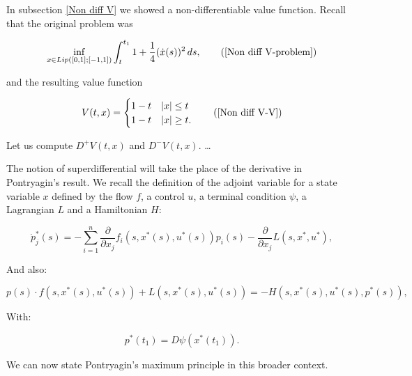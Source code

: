 \begin{example}
    In subsection \ref{Non diff V} we showed a non-differentiable value function. Recall that the original problem was
    
    \begin{equation}
        \inf_{x\in Lip([0,1];[-1,1])} \int_t^{t_1} 1 + \frac{1}{4}(\dot{x}(s))^2 \,ds,
        \tag{\ref{Non diff V-problem}}
    \end{equation}
    
    and the resulting value function
    
    \begin{equation}
        V(t,x)=\begin{cases}
            1-t & \abs{x}\leq t \\
            1-t& \abs{x}\geq t.
        \end{cases}
        \tag{\ref{Non diff V-V}}
    \end{equation}

    Let us compute $D^+V(t,x)$ and $D^-V(t,x)$. \dots
\end{example}

The notion of superdifferential will take the place of the derivative in Pontryagin's result. We recall the definition of the adjoint variable for a state variable $x$ defined by the flow $f$, a control $u$, 
a terminal condition $\psi$, a Lagrangian $L$ and a Hamiltonian $H$:

\begin{equation}\label{4-3-pontrydotp}
    \dot{p}_j^{\ast}(s) =  - \sum_{i=1}^n \frac{\partial}{\partial x_{j}}f_i(s,x^{\ast}(s),u^{\ast}(s))p_i(s) - \frac{\partial}{\partial x_{j}} L(s,x^{\ast},u^{\ast})  ,
\end{equation}

And also:

\begin{equation}\label{4-3-pontry-maxH}
    p(s)\cdot f(s,x^{\ast}(s),u^{\ast}(s)) + L(s,x^{\ast}(s),u^{\ast}(s)) = -H(s,x^{\ast}(s),u^{\ast}(s),p^{\ast}(s)),
\end{equation}

With:

\begin{equation}\label{4-3-pontry-trans}
    p^{\ast}(t_1) = D \psi(x^{\ast}(t_1)).
\end{equation}

We can now state Pontryagin's maximum principle in this broader context.

